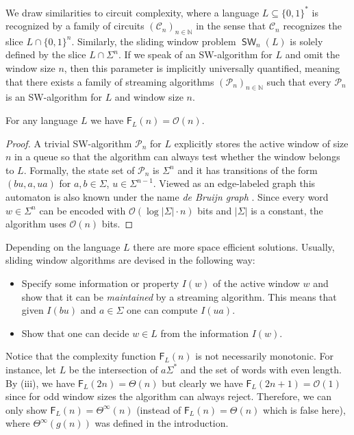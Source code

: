 \documentclass{theoretics}
\newcommand{\N}{\mathbb{N}}
\renewcommand{\O}{\mathcal{O}}
\renewcommand{\P}{\mathcal{P}}
\newcommand{\F}{\mathsf{F}}
\DeclareMathOperator{\SW}{\mathsf{SW}}
\newcommand{\Thetainf}{\Theta^{\scriptscriptstyle{\infty}}}
\begin{document}
We draw similarities to circuit complexity, where a language $L \subseteq \{0,1\}^*$ is recognized by a family of circuits
$(\mathcal{C}_n)_{n \in \N}$ in the sense that $\mathcal{C}_n$ recognizes the slice $L \cap \{0,1\}^n$.
Similarly, the sliding window problem $\SW_n(L)$ is solely defined by the slice
$L \cap \Sigma^n$.
If we speak of an SW-algorithm for $L$ and omit the window size $n$,
then this parameter is implicitly universally quantified,
meaning that there exists a family of streaming algorithms $(\P_n)_{n \in \N}$
such that every $\P_n$ is an SW-algorithm for $L$ and window size $n$.

\begin{lemma}
	For any language $L$ we have $\F_L(n) = \O(n)$.
\end{lemma}

\begin{proof}
	A trivial SW-algorithm $\P_n$ for $L$ explicitly
	stores the active window of size $n$ in a queue
	so that the algorithm can always test whether the window belongs to $L$.
	Formally, the state set of $\P_n$ is $\Sigma^n$ and it has transitions of the form
	$(bu,a,ua)$ for $a,b \in \Sigma$, $u \in \Sigma^{n-1}$.
	Viewed as an edge-labeled graph this automaton is also known
	under the name {\em de Bruijn graph} \cite{deBr46}. 
	Since every word $w \in \Sigma^n$ can be encoded with $\O(\log |\Sigma| \cdot n)$ bits and  $|\Sigma|$ is a constant,
	the algorithm uses $\O(n)$ bits.
\end{proof}

Depending on the language $L$ there are more space efficient solutions.
Usually, sliding window algorithms are devised in the following way:
\begin{itemize}
\item Specify some information or property $I(w)$ of the active window $w$
and show that it can be {\em maintained} by a streaming algorithm.
This means that given $I(bu)$ and $a \in \Sigma$ one can compute $I(ua)$.
\item Show that one can decide $w \in L$ from the information $I(w)$.
\end{itemize}
Notice that the complexity function $\F_L(n)$ is not necessarily monotonic.
For instance, let $L$ be the intersection of $a \Sigma^*$ and the set of words with even length. 
By (iii), we have $\F_L(2n) = \Theta(n)$ but clearly we have $\F_L(2n+1) = \O(1)$
since for odd window sizes the algorithm can always reject.
Therefore, we can only show $\F_L(n) = \Thetainf(n)$ (instead of $\F_L(n) = \Theta(n)$ which is false here),
where $\Thetainf(g(n))$ was defined in the introduction.
\end{document}
